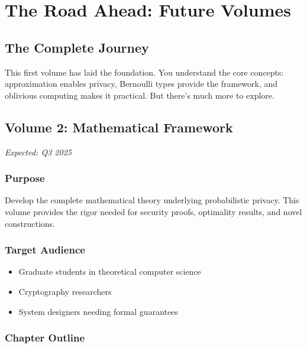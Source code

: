 \chapter{The Road Ahead: Future Volumes}
\label{ch:roadmap}

\section*{The Complete Journey}

This first volume has laid the foundation. You understand the core concepts: approximation enables privacy, Bernoulli types provide the framework, and oblivious computing makes it practical. But there's much more to explore.

\section{Volume 2: Mathematical Framework}

\textit{Expected: Q3 2025}

\subsection{Purpose}
Develop the complete mathematical theory underlying probabilistic privacy. This volume provides the rigor needed for security proofs, optimality results, and novel constructions.

\subsection{Target Audience}
\begin{itemize}
\item Graduate students in theoretical computer science
\item Cryptography researchers
\item System designers needing formal guarantees
\end{itemize}

\subsection{Chapter Outline}


